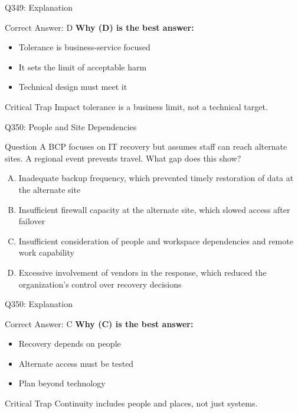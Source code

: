 \documentclass{beamer}
\begin{document}
	\begin{frame}{Q349: Explanation}
		\begin{block}{Correct Answer: D}
			\textbf{Why (D) is the best answer:}
			\begin{itemize}
				\item Tolerance is business-service focused
				\item It sets the limit of acceptable harm
				\item Technical design must meet it
			\end{itemize}
		\end{block}
		\begin{alertblock}{Critical Trap}
			Impact tolerance is a business limit, not a technical target.
		\end{alertblock}
	\end{frame}
	
	\begin{frame}{Q350: People and Site Dependencies}
		\begin{block}{Question}
			\small A BCP focuses on IT recovery but assumes staff can reach alternate sites. A regional event prevents travel. What gap does this show?
		\end{block}
		\begin{enumerate}[(A)]
			\footnotesize
			\item Inadequate backup frequency, which prevented timely restoration of data at the alternate site
			\item Insufficient firewall capacity at the alternate site, which slowed access after failover
			\item Insufficient consideration of people and workspace dependencies and remote work capability
			\item Excessive involvement of vendors in the response, which reduced the organization's control over recovery decisions
		\end{enumerate}
	\end{frame}
	
	\begin{frame}{Q350: Explanation}
		\begin{block}{Correct Answer: C}
			\textbf{Why (C) is the best answer:}
			\begin{itemize}
				\item Recovery depends on people
				\item Alternate access must be tested
				\item Plan beyond technology
			\end{itemize}
		\end{block}
		\begin{alertblock}{Critical Trap}
			Continuity includes people and places, not just systems.
		\end{alertblock}
	\end{frame}
	
\end{document}
